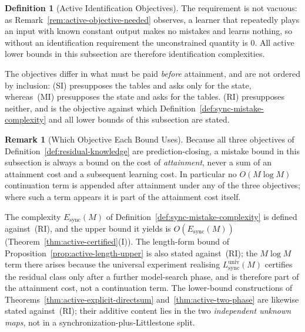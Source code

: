 \documentclass[12pt]{article}
\theoremstyle{definition}
\newtheorem{definition}[theorem]{Definition}
\newtheorem{remark}[theorem]{Remark}
\newcommand{\Lsyncu}{L_{\mathrm{sync}}^{\mathrm{univ}}}
\newcommand{\Esync}{E_{\mathrm{sync}}}
\begin{document}
\begin{definition}[Active Identification Objectives]
The requirement is not vacuous: as Remark~\ref{rem:active-objective-needed}
observes, a learner that repeatedly plays an input with known constant output
makes no mistakes and learns nothing, so without an identification requirement
the unconstrained quantity is $0$.  All active lower bounds in this subsection
are therefore identification complexities.

The objectives differ in what must be paid \emph{before} attainment, and are
not ordered by inclusion: (SI) presupposes the tables and asks only for the
state, whereas~(MI) presupposes the state and asks for the tables.  (RI)
presupposes neither, and is the objective against which
Definition~\ref{def:sync-mistake-complexity} and all lower bounds of this
subsection are stated.
\end{definition}

\begin{remark}[Which Objective Each Bound Uses]
\label{rem:objective-bookkeeping}
Because all three objectives of Definition~\ref{def:residual-knowledge} are
prediction-closing, a mistake bound in this subsection is always a bound on
the cost of \emph{attainment}, never a sum of an attainment cost and a
subsequent learning cost.  In particular no $O(M\log M)$ continuation term is
appended after attainment under any of the three objectives; where such a term
appears it is part of the attainment cost itself.

The complexity $\Esync(M)$ of Definition~\ref{def:sync-mistake-complexity} is
defined against~(RI), and the upper bound it yields is $O(\Esync(M))$
(Theorem~\ref{thm:active-certified}(I)).  The length-form bound of
Proposition~\ref{prop:active-length-upper} is also stated against~(RI); the
$M\log M$ term there arises because the universal experiment realising
$\Lsyncu(M)$ certifies the residual class only after a further model-search
phase, and is therefore part of the attainment cost, not a continuation term.
The lower-bound constructions of
Theorems~\ref{thm:active-explicit-directsum} and~\ref{thm:active-two-phase}
are likewise stated against~(RI); their additive content lies in the two
\emph{independent unknown maps}, not in a synchronization-plus-Littlestone
split.
\end{remark}
\end{document}
